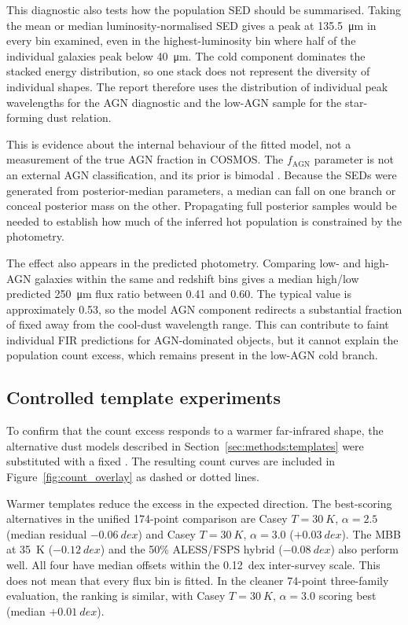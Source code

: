 \documentclass[12pt,a4paper]{article}
\begin{document}
This diagnostic also tests how the population SED should be summarised. Taking the mean
or median luminosity-normalised SED gives a peak at \SI{135.5}{\um} in every \LIR{} bin
examined,
even in the highest-luminosity bin where half of the individual galaxies peak below
\SI{40}{\um}. The cold component dominates the stacked energy distribution, so one
stack does not represent the diversity of individual shapes. The report therefore uses
the distribution of individual peak wavelengths for the AGN diagnostic and the low-AGN
sample for the star-forming dust relation.

This is evidence about the internal behaviour of the fitted model, not a measurement of
the true AGN fraction in COSMOS. The $f_\mathrm{AGN}$ parameter is not an external AGN
classification, and its prior is bimodal \citep{Thorp_2025_insights}. Because the SEDs
were generated from posterior-median parameters, a median can fall on one branch or
conceal posterior mass on the other. Propagating full posterior samples would be needed
to establish how much of the inferred hot population is constrained by the photometry.

The effect also appears in the predicted photometry. Comparing low- and high-AGN
galaxies within the same \LIR{} and redshift bins gives a median high/low predicted
\SI{250}{\um} flux ratio between 0.41 and 0.60. The typical value is approximately
0.53, so the model AGN component redirects a substantial fraction of fixed \LIR{} away
from the cool-dust wavelength range. This can contribute to faint individual FIR
predictions for AGN-dominated objects, but it cannot explain the population count
excess, which remains present in the low-AGN cold branch.

\subsection{Controlled template experiments}
\label{sec:results:templates}

To confirm that the count excess responds to a warmer far-infrared shape, the
alternative dust models described in Section~\ref{sec:methods:templates} were
substituted with a fixed \LIR{}. The resulting count curves are included in
Figure~\ref{fig:count_overlay} as dashed or dotted lines.

Warmer templates reduce the excess in the expected direction. The best-scoring
alternatives in the unified 174-point comparison are Casey $T = \SI{30}{K}$,
$\alpha = 2.5$ (median residual $-\SI{0.06}{dex}$) and Casey $T = \SI{30}{K}$,
$\alpha = 3.0$ ($+\SI{0.03}{dex}$). The MBB at \SI{35}{K} ($-\SI{0.12}{dex}$) and the
50\% ALESS/FSPS hybrid ($-\SI{0.08}{dex}$) also perform well. All four have median
offsets within the \SI{0.12}{dex} inter-survey scale. This does not mean that every flux
bin is fitted. In the cleaner 74-point three-family
evaluation, the ranking is similar, with Casey $T = \SI{30}{K}$, $\alpha = 3.0$ scoring
best (median $+\SI{0.01}{dex}$).
\end{document}
